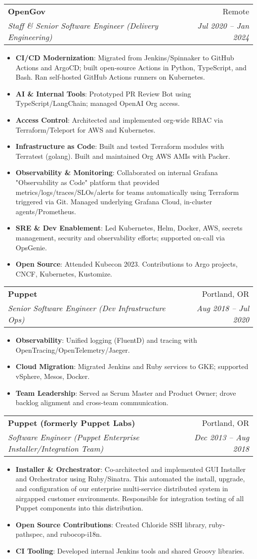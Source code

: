 \documentclass[letterpaper,11pt]{article}
\makeatletter
\newcommand{\resumeItem}[2]{
\item[\textsc{}]\small{
    \textbf{#1}{: #2 \vspace{-2pt}}
  }
}
\newcommand{\resumeSubheading}[4]{
  \vspace{-1pt}\item
    \begin{tabular*}{0.97\textwidth}[t]{l@{\extracolsep{\fill}}r}
      \textbf{#1} & #2 \\
      \textit{\small#3} & \textit{\small #4} \\
    \end{tabular*}\vspace{-5pt}
}
\newcommand{\resumeItemListStart}{\begin{itemize}}
\newcommand{\resumeItemListEnd}{\end{itemize}\vspace{-5pt}}
\makeatother
\begin{document}
\resumeSubheading
  {OpenGov}{Remote}
  {Staff \& Senior Software Engineer (Delivery Engineering)}{Jul 2020 -- Jan 2024}
  \resumeItemListStart
    \resumeItem{CI/CD Modernization}
      {Migrated from Jenkins/Spinnaker to GitHub Actions and ArgoCD; built open-source Actions in Python, TypeScript, and Bash. Ran self-hosted GitHub Actions runners on Kubernetes.}
    \resumeItem{AI \& Internal Tools}
      {Prototyped PR Review Bot using TypeScript/LangChain; managed OpenAI Org access.}
    \resumeItem{Access Control}
      {Architected and implemented org-wide RBAC via Terraform/Teleport for AWS and Kubernetes.}
    \resumeItem{Infrastructure as Code}
      {Built and tested Terraform modules with Terratest (golang). Built and maintained Org AWS AMIs with Packer.}
    \resumeItem{Observability \& Monitoring}
      {Collaborated on internal Grafana "Observability as Code" platform that provided metrics/logs/traces/SLOs/alerts for teams automatically using Terraform triggered via Git. Managed underlying Grafana Cloud, in-cluster agents/Prometheus.}
    \resumeItem{SRE \& Dev Enablement}
      {Led Kubernetes, Helm, Docker, AWS, secrets management, security and observability efforts; supported on-call via OpsGenie.}
    \resumeItem{Open Source}
      {Attended Kubecon 2023. Contributions to Argo projects, CNCF, Kubernetes, Kustomize.}
  \resumeItemListEnd

\resumeSubheading
  {Puppet}{Portland, OR}
  {Senior Software Engineer (Dev Infrastructure Ops)}{Aug 2018 -- Jul 2020}
  \resumeItemListStart
    \resumeItem{Observability}
      {Unified logging (FluentD) and tracing with OpenTracing/OpenTelemetry/Jaeger.}
    \resumeItem{Cloud Migration}
      {Migrated Jenkins and Ruby services to GKE; supported vSphere, Mesos, Docker.}
    \resumeItem{Team Leadership}
      {Served as Scrum Master and Product Owner; drove backlog alignment and cross-team communication.}
  \resumeItemListEnd

\resumeSubheading
  {Puppet (formerly Puppet Labs)}{Portland, OR}
  {Software Engineer (Puppet Enterprise Installer/Integration Team)}{Dec 2013 -- Aug 2018}
  \resumeItemListStart
    \resumeItem{Installer \& Orchestrator}
      {Co-architected and implemented GUI Installer and Orchestrator using Ruby/Sinatra. This automated the install, upgrade, and configuration of our enterprise multi-service distributed system in airgapped customer environments. Responsible for integration testing of all Puppet components into this distribution.}
    \resumeItem{Open Source Contributions}
      {Created Chloride SSH library, ruby-pathspec, and rubocop-i18n.}
    \resumeItem{CI Tooling}
      {Developed internal Jenkins tools and shared Groovy libraries.}
  \resumeItemListEnd
\end{document}
